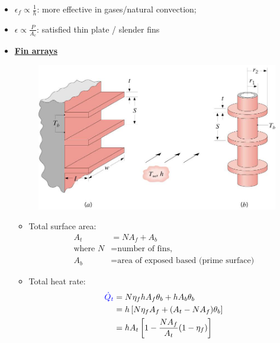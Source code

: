 \begin{itemize}
    \item $\epsilon_f \propto \frac{1}{h}$: more effective in gases/natural convection;
    \item $\epsilon \propto \frac{P}{A_c}$: satisfied thin plate / slender fins
    \item \underline{\textbf{Fin arrays}}
    \begin{figure}[H]
        \centering
        \includegraphics[width=1.0\linewidth]{images/fin_array_diagram.png}
    \end{figure}
    \begin{itemize}
        \item Total surface area:
        \begin{align*}
            A_t &= N A_f + A_b \\
            \text{where } N &= \text{number of fins,} \\
            A_b &= \text{area of exposed based (prime surface)}
        \end{align*}
        \item Total heat rate:
        \begin{align*}
            \color{blue} \dot{Q}_t &= \color{black} N \eta_f h A_f \theta_b + h A_b \theta_b \\
            &= h\left[N\eta_f A_f + (A_t - N A_f)\theta_b \right] \\
            &= h A_t \left[1 - \frac{NA_f}{A_t}(1-\eta_f)\right]
        \end{align*}
    \end{itemize}
\end{itemize}


